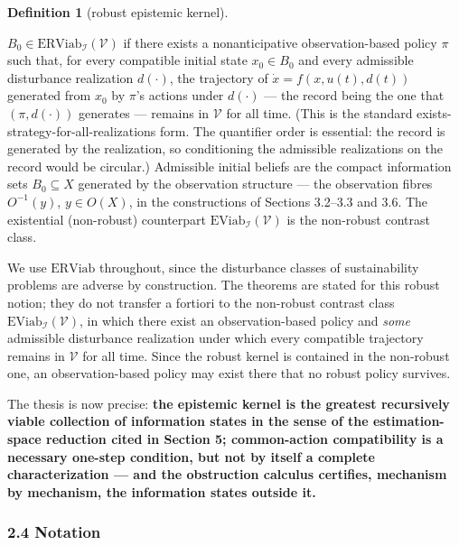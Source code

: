 \documentclass[10pt,twocolumn]{article}
\theoremstyle{definition}
\newtheorem{definition}{Definition}
\begin{document}
\begin{definition}[robust epistemic kernel]\label{def:kernel}

\(B_0 \in \mathrm{ERViab}_{\mathcal{I}}(\mathcal{V})\) if there exists a
nonanticipative observation-based policy \(\pi\) such that, for every
compatible initial state \(x_0 \in B_0\) and every admissible
disturbance realization \(d(\cdot)\), the trajectory of
\(\dot x = f(x, u(t), d(t))\) generated from \(x_0\) by \(\pi\)'s
actions under \(d(\cdot)\) --- the record being the one that
\((\pi, d(\cdot))\) generates --- remains in \(\mathcal{V}\) for all
time. (This is the standard exists-strategy-for-all-realizations form. The quantifier order is essential: the record is generated by the realization, so conditioning the admissible realizations on the record would be circular.) Admissible initial
beliefs are the compact information sets \(B_0 \subseteq X\) generated
by the observation structure --- the observation fibres \(O^{-1}(y)\),
\(y \in O(X)\), in the constructions of Sections 3.2--3.3 and 3.6. The existential (non-robust) counterpart \(\mathrm{EViab}_{\mathcal{I}}(\mathcal{V})\) is the non-robust contrast class.

\end{definition}

We use \(\mathrm{ERViab}\) throughout, since the disturbance classes of sustainability problems are adverse by construction. The theorems are stated for this robust notion; they do not transfer a fortiori to the non-robust contrast class \(\mathrm{EViab}_{\mathcal{I}}(\mathcal{V})\), in which there exist an observation-based policy and \emph{some} admissible disturbance realization under which every compatible trajectory remains in \(\mathcal{V}\) for all time. Since the robust kernel is contained in the non-robust one, an observation-based policy may exist there that no robust policy survives.

The thesis is now precise:
\textbf{the epistemic kernel is the greatest recursively viable collection of information states in the sense of the estimation-space reduction cited in Section 5; common-action compatibility is a necessary one-step condition, but not by itself a
complete characterization --- and the obstruction calculus certifies,
mechanism by mechanism, the information states outside it.}

\subsubsection{2.4 Notation}\label{notation}
\end{document}
